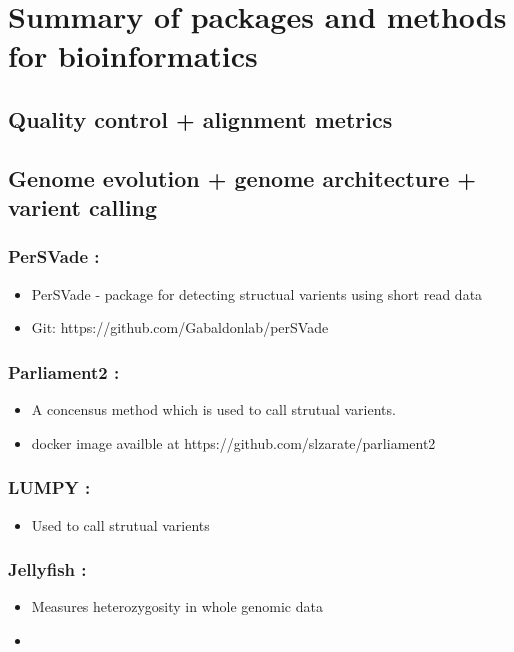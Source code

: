 \documentclass[document.tex]{subfiles}
\begin{document}
\chapter{Summary of packages and methods for bioinformatics}
\label{day:2023-02-15}

\section*{Quality control + alignment metrics}

\section*{Genome evolution + genome architecture + varient calling}

    \subsection{PerSVade :}
    \begin{itemize}
    \item PerSVade - package for detecting structual varients using short read data
    \item Git: https://github.com/Gabaldonlab/perSVade 
    \end{itemize}
    
    \subsection{Parliament2 :}
    \begin{itemize}
    \item A concensus method which is used to call strutual varients.
    \item docker image availble at https://github.com/slzarate/parliament2 
    \end{itemize}
    
    \subsection{LUMPY :}
    \begin{itemize}
    \item Used to call strutual varients 
    \end{itemize}

    \subsection{Jellyfish :\citetitle{}}
    \begin{itemize}
    \item Measures heterozygosity in whole genomic data
    \item 
    \end{itemize}
\end{document}
